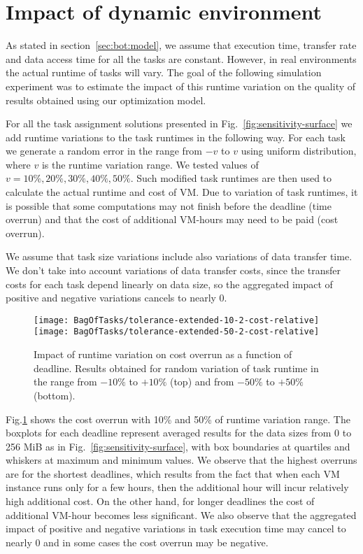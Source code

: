 {\section{Impact of dynamic environment}
\label{sec:bot:dynamic}
    
  As stated in section~\ref{sec:bot:model}, we assume that execution time,
  transfer rate and data access time for all the tasks are constant. However,
  in real environments the actual runtime of tasks will vary. The goal of the
  following simulation experiment was to estimate the impact of this runtime
  variation on the quality of results obtained using our optimization model.
  
  For all the task assignment solutions presented in Fig.~\ref{fig:sensitivity-surface} 
  we add runtime variations to the task runtimes in the following way. For each task
  we generate a random error in the range from $-v$ to $v$ using uniform distribution,
  where $v$ is the runtime variation range. We tested values of $v=10\%, 20\%, 30\%, 40\%, 50\%$. 
  Such modified task runtimes are then used to calculate the actual runtime and cost of 
  VM. Due to variation of task runtimes, it is possible that some computations may not 
  finish before the deadline (time overrun) and that the cost of additional VM-hours
  may need to be paid (cost overrun).

  We assume that task size variations include also
  variations of data transfer time. We don't take into account variations of
  data transfer costs, since the transfer costs for each task depend linearly
  on data size, so the aggregated impact of positive and negative variations
  cancels to nearly $0$.
  
  \begin{figure}[tb]
     \centering
     \texttt{[image: BagOfTasks/tolerance-extended-10-2-cost-relative]}  
     \texttt{[image: BagOfTasks/tolerance-extended-50-2-cost-relative]}  
 	   \caption{Impact of runtime variation on cost overrun as a function of deadline. 
 	   Results obtained for random variation of task runtime in the range from $-10\%$ to $+10\%$ (top)
 	   and from $-50\%$ to $+50\%$ (bottom). }
 	   \label{fig:dynamic-cost}
  \end{figure} 
  
  Fig.\ref{fig:dynamic-cost} shows the cost overrun with 10\% and 50\%  of runtime
  variation range.  The boxplots for each deadline represent averaged
  results for the data sizes from 0 to 256 MiB as in
  Fig.~\ref{fig:sensitivity-surface}, with box boundaries at quartiles
  and whiskers at maximum and minimum values. We observe that the highest
  overruns are for the shortest deadlines, which results from the fact that
  when each VM instance runs only for a few hours, then the additional hour
  will incur relatively high additional cost. On the other hand, for longer
  deadlines the cost of additional VM-hour becomes less significant. We also
  observe that the aggregated impact of positive and negative variations in
  task execution time may cancel to nearly $0$ and in some cases the cost
  overrun may be negative.

}
